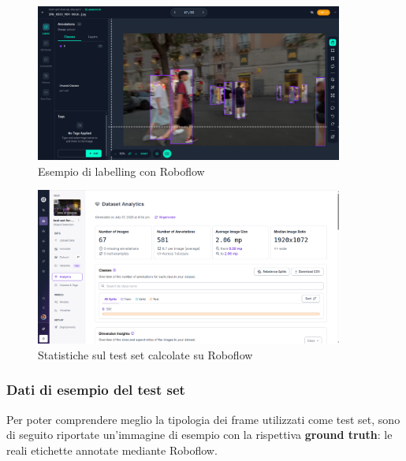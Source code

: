 \documentclass[12pt]{article}
\begin{document}
\begin{figure}[H]
    \centering
    \includegraphics[width=0.90\textwidth]{./img/roboflow-label-example.png}
    \caption{Esempio di labelling con Roboflow}
    \label{fig:roboflow-labelling}
\end{figure}

\begin{figure}[H]
    \centering
    \includegraphics[width=0.90\textwidth]{./img/roboflow-test-set.png}
    \caption{Statistiche sul test set calcolate su Roboflow}
    \label{fig:roboflow-test-set}
\end{figure}

\subsubsection{Dati di esempio del test set}
Per poter comprendere meglio la tipologia dei frame utilizzati come test set, sono di seguito riportate un'immagine di esempio con la rispettiva \textbf{ground truth}: le reali etichette annotate mediante Roboflow.
\end{document}
